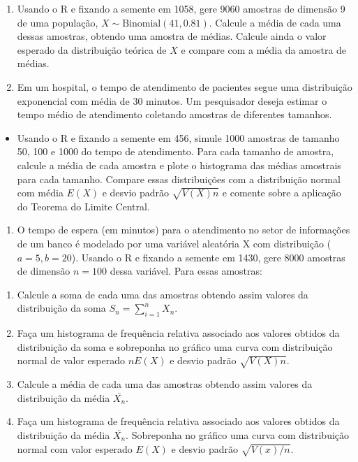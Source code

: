 \documentclass[
]{book}
\providecommand{\tightlist}{%
  \setlength{\itemsep}{0pt}\setlength{\parskip}{0pt}}
\begin{document}
\begin{enumerate}
\def\labelenumi{\arabic{enumi}.}
\setcounter{enumi}{13}
\item
  Usando o R e fixando a semente em 1058, gere 9060 amostras de dimensão 9 de uma população, \(X\sim \text{Binomial}(41,0.81)\). Calcule a média de cada uma dessas amostras, obtendo uma amostra de médias. Calcule ainda o valor esperado da distribuição teórica de \(X\) e compare com a média da amostra de médias.
\item
  Em um hospital, o tempo de atendimento de pacientes segue uma distribuição exponencial com média de 30 minutos. Um pesquisador deseja estimar o tempo médio de atendimento coletando amostras de diferentes tamanhos.
\end{enumerate}

\begin{itemize}
\tightlist
\item
  Usando o R e fixando a semente em 456, simule 1000 amostras de tamanho 50, 100 e 1000 do tempo de atendimento. Para cada tamanho de amostra, calcule a média de cada amostra e plote o histograma das médias amostrais para cada tamanho. Compare essas distribuições com a distribuição normal com média \(E(X)\) e desvio padrão \(\sqrt{V(X)n}\) e comente sobre a aplicação do Teorema do Limite Central.
\end{itemize}

\begin{enumerate}
\def\labelenumi{\arabic{enumi}.}
\setcounter{enumi}{15}
\tightlist
\item
  O tempo de espera (em minutos) para o atendimento no setor de informações de um banco é modelado por uma variável aleatória X com distribuição (\(a=5, b=20\)). Usando o R e fixando a semente em 1430, gere 8000 amostras de dimensão \(n=100\) dessa variável. Para essas amostras:
\end{enumerate}

\begin{enumerate}
\def\labelenumi{(\alph{enumi})}
\item
  Calcule a soma de cada uma das amostras obtendo assim valores da distribuição da soma \(S_{n} = \sum_{i=1}^{n}X_{n}\).
\item
  Faça um histograma de frequência relativa associado aos valores obtidos da distribuição da soma e sobreponha no gráfico uma curva com distribuição normal de valor esperado \(nE(X)\) e desvio padrão \(\sqrt{V(X)n}\).
\item
  Calcule a média de cada uma das amostras obtendo assim valores da distribuição da média \(\bar{X_{n}}\).
\item
  Faça um histograma de frequência relativa associado aos valores obtidos da distribuição da média \(\bar{X_{n}}\). Sobreponha no gráfico uma curva com distribuição normal com valor esperado \(E(X)\) e desvio padrão \(\sqrt{V(x)/n}\).
\end{enumerate}
\end{document}
